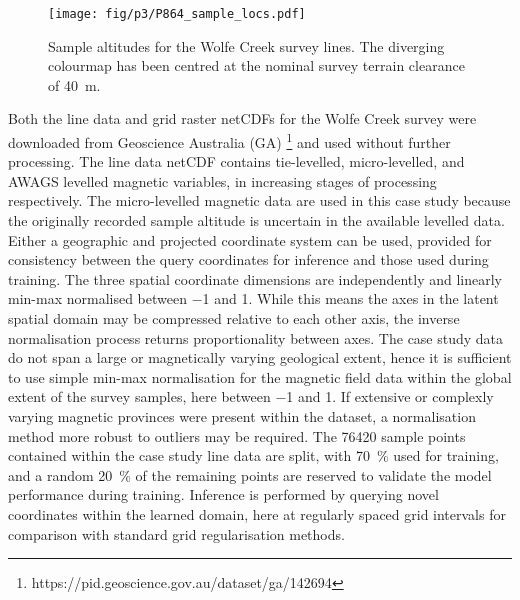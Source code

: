 \begin{figure}[hbtp]
    \centering{}
    \texttt{[image: fig/p3/P864\_sample\_locs.pdf]}
    \caption[The Wolfe Creek Meteorite Crater survey]{Sample altitudes for the Wolfe Creek survey lines. The diverging colourmap has been centred at the nominal survey terrain clearance of \qty{40}{\m}.}
    \label{fig:samples}
\end{figure}

Both the line data and grid raster netCDFs for the Wolfe Creek survey were downloaded from Geoscience Australia (GA) \footnote{https://pid.geoscience.gov.au/dataset/ga/142694} and used without further processing.
The line data netCDF contains tie-levelled, micro-levelled, and AWAGS levelled magnetic variables, in increasing stages of processing respectively.
The micro-levelled magnetic data are used in this case study because the originally recorded sample altitude is uncertain in the available levelled data.
Either a geographic and projected coordinate system can be used, provided for consistency between the query coordinates for inference and those used during training.
The three spatial coordinate dimensions are independently and linearly min-max normalised between \num{-1} and \num{1}.
While this means the axes in the latent spatial domain may be compressed relative to each other axis, the inverse normalisation process returns proportionality between axes.
The case study data do not span a large or magnetically varying geological extent, hence it is sufficient to use simple min-max normalisation for the magnetic field data within the global extent of the survey samples, here between \num{-1} and \num{1}.
If extensive or complexly varying magnetic provinces were present within the dataset, a normalisation method more robust to outliers may be required.
The \num{76420} sample points contained within the case study line data are split, with \qty{70}{\percent} used for training, and a random \qty{20}{\percent} of the remaining points are reserved to validate the model performance during training.
Inference is performed by querying novel coordinates within the learned domain, here at regularly spaced grid intervals for comparison with standard grid regularisation methods.

